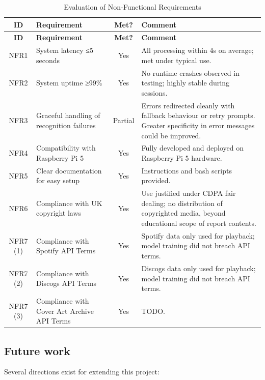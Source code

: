         \begin{longtable}{|c|p{5cm}|c|p{5cm}|}
            \caption{Evaluation of Non-Functional Requirements} \label{tab:NFR}\\
            \hline
            \textbf{ID} & \textbf{Requirement} & \textbf{Met?} & \textbf{Comment} \\
            \hline
            \endfirsthead
            \hline
            \textbf{ID} & \textbf{Requirement} & \textbf{Met?} & \textbf{Comment} \\
            \hline
            \endhead
            NFR1 & System latency ≤5 seconds & Yes & All processing within 4s on average; met under typical use. \\
            \hline
            NFR2 & System uptime ≥99\% & Yes & No runtime crashes observed in testing; highly stable during sessions. \\
            \hline
            NFR3 & Graceful handling of recognition failures & Partial & Errors redirected cleanly with fallback behaviour or retry prompts. Greater specificity in error messages could be improved. \\
            \hline
            NFR4 & Compatibility with Raspberry Pi 5 & Yes & Fully developed and deployed on Raspberry Pi 5 hardware. \\
            \hline
            NFR5 & Clear documentation for easy setup & Yes & Instructions and bash scripts provided. \\
            \hline
            NFR6 & Compliance with UK copyright laws & Yes & Use justified under CDPA fair dealing; no distribution of copyrighted media, beyond educational scope of report contents. \\
            \hline
            NFR7 (1) & Compliance with Spotify API Terms & Yes & Spotify data only used for playback; model training did not breach API terms. \\
            \hline
            NFR7 (2) & Compliance with Discogs API Terms & Yes & Discogs data only used for playback; model training did not breach API terms. \\
            \hline
            NFR7 (3) & Compliance with Cover Art Archive API Terms & Yes & TODO. \\
            \hline
        \end{longtable}
    
        
        \subsection{Future work}
          Several directions exist for extending this project:
    
